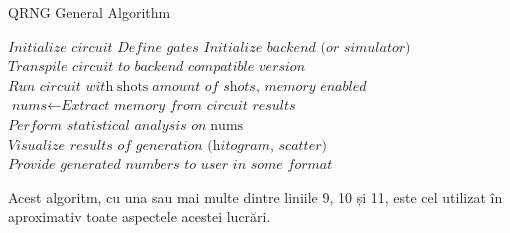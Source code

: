\begin{algorithm}[ht]
    \caption{QRNG General Algorithm}\label{alg:QRNG}
    \begin{algorithmic}[1]
           \State $\textit{Initialize circuit}$
           \State $\textit{Define gates}$
           \State $\textit{Initialize backend (or simulator)}$
           \State $\textit{Transpile circuit to backend compatible version}$
           \State $\textit{Run circuit with} \; \text{shots}\; \textit{amount of shots, memory enabled}$
           \State $\textit{nums} \gets \textit{Extract memory from circuit results}$
           \State $\textit{Perform statistical analysis on} \; \text{nums}$
           \State $\textit{Visualize results of generation (hitogram, scatter)}$
           \State $\textit{Provide generated numbers to user in some format}$
           \EndFor
        \EndProcedure
    \end{algorithmic}
\end{algorithm}

Acest algoritm, cu una sau mai multe dintre liniile 9, 10 și 11, este cel utilizat în aproximativ toate aspectele acestei lucrări.


